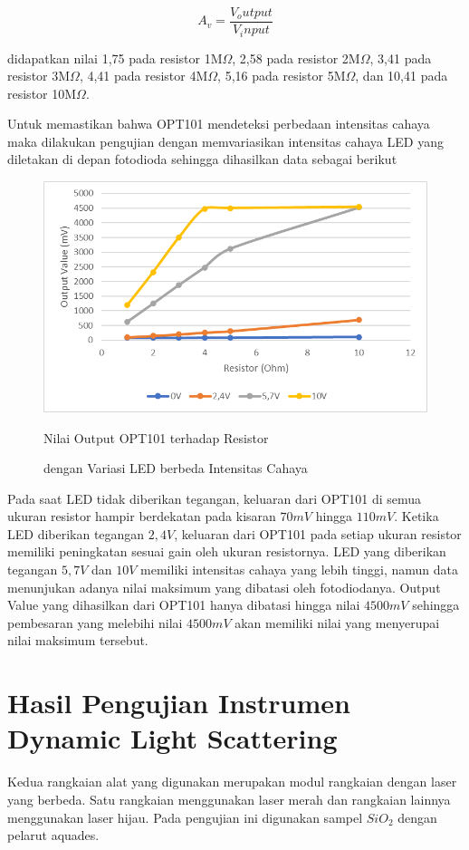 \begin{equation}
  A_v = \frac{V_output}{V_input}
\end{equation}

didapatkan nilai 1,75 pada resistor 1M${\Omega}$, 2,58 pada
resistor 2M${\Omega}$, 3,41 pada resistor 3M${\Omega}$, 4,41
pada resistor 4M${\Omega}$, 5,16 pada resistor 5M${\Omega}$,
dan 10,41 pada resistor 10M${\Omega}$.

Untuk memastikan bahwa OPT101 mendeteksi perbedaan intensitas
cahaya maka dilakukan pengujian dengan memvariasikan intensitas
cahaya LED yang diletakan di depan fotodioda sehingga dihasilkan
data sebagai berikut

\begin{figure}[H]
  \centering
  \includegraphics{Images/GainWLED.png}
  \caption{Nilai Output OPT101 terhadap Resistor}
  \captionsetup{aboveskip=1.5pt}
  \caption*{dengan Variasi LED berbeda Intensitas Cahaya}
  \label{fig:gain_led}
\end{figure}

Pada saat LED tidak diberikan tegangan, keluaran dari OPT101 di
semua ukuran resistor hampir berdekatan pada kisaran ${70mV}$
hingga ${110mV}$. Ketika LED diberikan tegangan ${2,4V}$,
keluaran dari OPT101 pada setiap ukuran resistor memiliki
peningkatan sesuai gain oleh ukuran resistornya. LED yang
diberikan tegangan ${5,7V}$ dan ${10V}$ memiliki intensitas
cahaya yang lebih tinggi, namun data menunjukan adanya nilai
maksimum yang dibatasi oleh fotodiodanya. Output Value yang
dihasilkan dari OPT101 hanya dibatasi hingga nilai ${4500mV}$
sehingga pembesaran yang melebihi nilai ${4500mV}$ akan memiliki
nilai yang menyerupai nilai maksimum tersebut.

\section{Hasil Pengujian Instrumen Dynamic Light Scattering}
Kedua rangkaian alat yang digunakan merupakan modul rangkaian
dengan laser yang berbeda. Satu rangkaian menggunakan laser
merah dan rangkaian lainnya menggunakan laser hijau. Pada
pengujian ini digunakan sampel ${SiO_2}$ dengan pelarut aquades.

